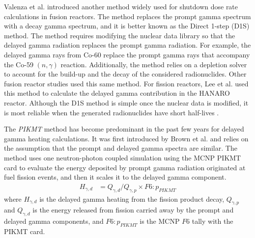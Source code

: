 Valenza et al. \cite{valenza_proposal_2001} introduced another method widely used for shutdown dose rate calculations in fusion reactors.
The method replaces the prompt gamma spectrum with a decay gamma spectrum, and it is better known as the Direct 1-step (D1S) method.
The method requires modifying the nuclear data library so that the delayed gamma radiation replaces the prompt gamma radiation.
For example, the delayed gamma rays from Co-60 replace the prompt gamma rays that accompany the Co-59 $(n, \gamma)$ reaction.
Additionally, the method relies on a depletion solver to account for the build-up and the decay of the considered radionuclides.
Other fusion reactor studies \cite{petrizzi_improvement_2001, palermo_shutdown_2017} used this same method.
For fission reactors, Lee et al. \cite{lee_analysis_2008} used this method to calculate the delayed gamma contribution in the HANARO reactor.
Although the D1S method is simple once the nuclear data is modified, it is most reliable when the generated radionuclides have short half-lives \cite{noh_estimation_2018}.

The \textit{PIKMT} method has become predominant in the past few years for delayed gamma heating calculations.
It was first introduced by Brown et al. \cite{brown_monte_2008} and relies on the assumption that the prompt and delayed gamma spectra are similar.
The method uses one neutron-photon coupled simulation using the MCNP PIKMT card to evaluate the energy deposited by prompt gamma radiation originated at fuel fission events, and then it scales it to the delayed gamma component.
\begin{align}
H_{\gamma, d} &= Q_{\gamma, d} / Q_{\gamma, p} \times F6\!:\!p_{PIKMT}
\end{align}
where $H_{\gamma, d}$ is the delayed gamma heating from the fission product decay, $Q_{\gamma, p}$ and $Q_{\gamma, d}$ is the energy released from fission carried away by the prompt and delayed gamma components, and $F6\!:\!p_{PIKMT}$ is the MCNP $F6$ tally with the PIKMT card.

